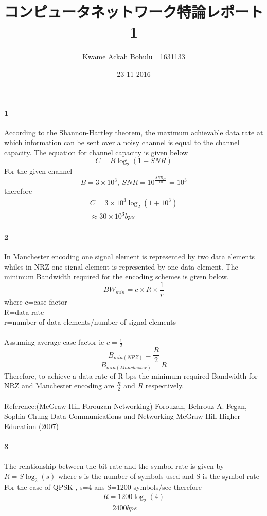 \documentclass[24 pts]{article}
\title{コンピュータネットワーク特論レポート1	 }
\date{23-11-2016}
\author{Kwame Ackah Bohulu　1631133}
\begin{document}
\maketitle
\newpage
\paragraph{1}
According to the Shannon-Hartley theorem, the maximum achievable data rate at which information can be sent over a noisy channel is equal to the channel capacity. The equation for channel capacity is given below
$$C=B\log_2(1+SNR)$$
For the given channel 
$$B=3 \times 10^3,  \ SNR=10^{\frac{SNR_{dB}}{10}} = 10^3$$
therefore 
\begin{equation*}
\begin{split}
C=3 \times 10^3\log_2(1+10^3)\\
\approx 30\times10^3 bps
\end{split}
\end{equation*}
\newpage
\paragraph{2}
In Manchester encoding one signal element is represented by two data elements whiles in NRZ one signal element is represented by one data element. The minimum Bandwidth required for the encoding schemes is given below.
$$BW_{min}=c\times R\times \frac{1}{r}$$
where
c=case factor\\
R=data rate\\
r=number of data elements/number of signal elements\\
\paragraph{}
Assuming average case factor ie $c=\frac{1}{2}$\\
$$B_{min(NRZ)}=\frac{R}{2}$$
$$B_{min(Manchester)}=R$$
Therefore, to achieve a data rate of R bps the minimum required Bandwidth for NRZ and Manchester encoding are $\frac{R}{2}$ and $R$ respectively.
\paragraph{}
Reference:(McGraw-Hill Forouzan Networking) Forouzan, Behrouz A. Fegan, Sophia Chung-Data Communications and Networking-McGraw-Hill Higher Education (2007)
\newpage
\paragraph{3}
The relationship between the bit rate and the symbol rate is given by
$R=S\log_2(s)$
where s is the number of symbols used and S is the symbol rate
For the case of QPSK , s=4 ans S=1200 symbols/sec
therefore
\begin{equation*}
\begin{split}
R=1200\log_2(4)\\
=2400 bps
\end{split}
\end{equation*}
\end{document}
